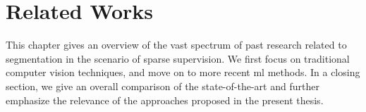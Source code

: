 \chapter{Related Works}
\glsresetall

\renewcommand{\thealgsubstate}{\alph{algsubstate}}
\newenvironment{algsubstates}
  {\setcounter{algsubstate}{0}%
   \renewcommand{\State}{%
     \stepcounter{algsubstate}%
     \Statex {\footnotesize\thealgsubstate:}\space}}
  {}

This chapter gives an overview of the vast spectrum of past research related to segmentation in the scenario of sparse supervision.
We first focus on traditional computer vision techniques, and
move on to more recent \gls{ml} methods.
In a closing section, we give an overall comparison of the state-of-the-art
and further emphasize the relevance of the approaches proposed in the present thesis.




